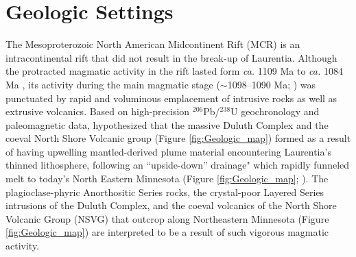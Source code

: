 \documentclass[draft]{agujournal2019}
\begin{document}

\section*{Geologic Settings}

The Mesoproterozoic North American Midcontinent Rift (MCR) is an intracontinental rift that did not result in the break-up of Laurentia. Although the protracted magmatic activity in the rift lasted form \textit{ca.} 1109 Ma to \textit{ca.} 1084 Ma \cite{Swanson-Hysell2019a}, its activity during the main magmatic stage ($\sim$1098–1090 Ma; ) was punctuated by rapid and voluminous emplacement of intrusive rocks as well as extrusive volcanics. Based on high-precision $^{206}$Pb/$^{238}$U geochronology and paleomagnetic data,  hypothesized that the massive Duluth Complex and the coeval North Shore Volcanic group (Figure \ref{fig:Geologic_map}) formed as a result of having upwelling mantled-derived plume material encountering Laurentia's thinned lithosphere, following an ``upside-down” drainage" which rapidly funneled melt to today's North Eastern Minnesota (Figure \ref{fig:Geologic_map}; ). The plagioclase-phyric Anorthositic Series rocks, the crystal-poor Layered Series intrusions of the Duluth Complex, and the coeval volcanics of the North Shore Volcanic Group (NSVG) that outcrop along Northeastern Minnesota (Figure \ref{fig:Geologic_map}) are interpreted to be a result of such vigorous magmatic activity. 
\end{document}

